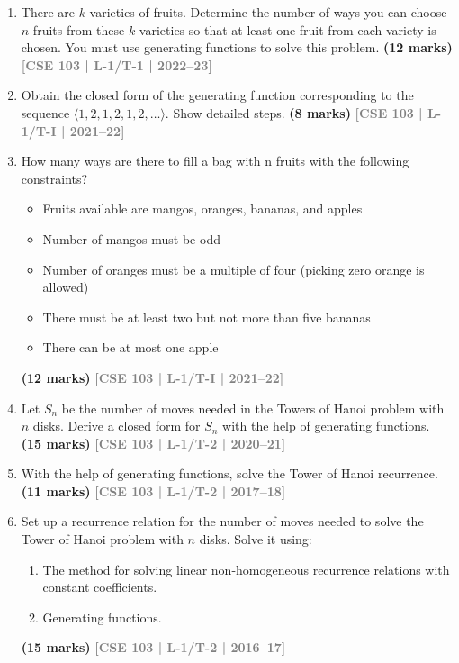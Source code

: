 \documentclass[12pt,a3paper]{article}
\newcommand{\yr}[1]{\hfill\textcolor{gray}{\small\textbf{[#1]}}}
\newcommand{\mk}[1]{\textcolor{orange!70!black}{\small\textbf{(#1 marks)}}}
\begin{document}
\begin{enumerate}
\item There are $k$ varieties of fruits. Determine the number of ways you can choose $n$ fruits from these $k$ varieties so that at least one fruit from each variety is chosen. You must use generating functions to solve this problem.
\mk{12} \yr{CSE 103 | L-1/T-1 | 2022--23}

\item Obtain the closed form of the generating function corresponding to the sequence $\langle 1, 2, 1, 2, 1, 2, \dots \rangle$. Show detailed steps.
\mk{8} \yr{CSE 103 | L-1/T-I | 2021--22}

\item How many ways are there to fill a bag with n fruits with the following constraints?
\begin{itemize}
    \item Fruits available are mangos, oranges, bananas, and apples
    \item Number of mangos must be odd
    \item Number of oranges must be a multiple of four (picking zero orange is allowed)
    \item There must be at least two but not more than five bananas
    \item There can be at most one apple
\end{itemize}
\mk{12} \yr{CSE 103 | L-1/T-I | 2021--22}

\item Let $S_n$ be the number of moves needed in the Towers of Hanoi problem with $n$ disks. Derive a closed form for $S_n$ with the help of generating functions.
\mk{15} \yr{CSE 103 | L-1/T-2 | 2020--21}  

\item With the help of generating functions, solve the Tower of Hanoi recurrence.
\mk{11} \yr{CSE 103 | L-1/T-2 | 2017--18}

\item Set up a recurrence relation for the number of moves needed to solve the Tower of Hanoi problem with $n$ disks. Solve it using:
\begin{enumerate}
  \item The method for solving linear non-homogeneous recurrence relations with constant coefficients.
  \item Generating functions.
\end{enumerate}
\mk{15} \yr{CSE 103 | L-1/T-2 | 2016--17}

\end{enumerate}
\end{document}
